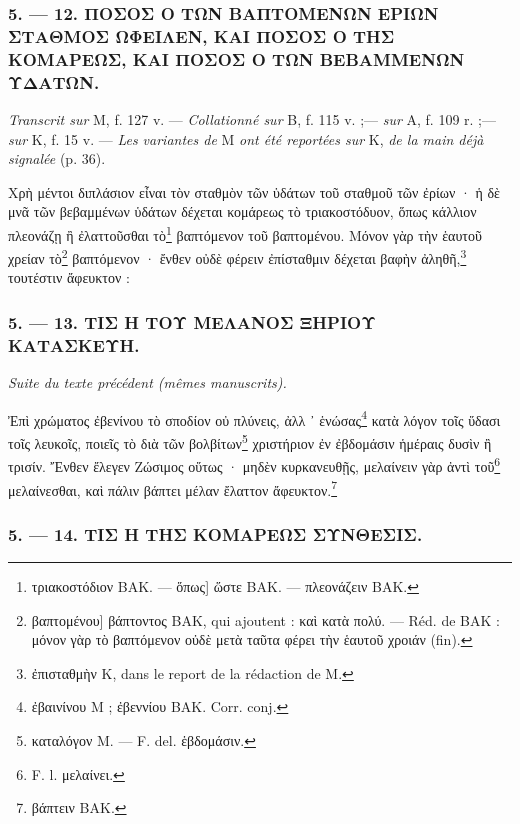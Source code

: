 \documentclass[a4paper, 11pt, oneside, polutonikogreek, french]{article}
\begin{document}
\subsubsection{5. --- 12. ΠΟΣΟΣ Ο ΤΩΝ ΒΑΠΤΟΜΕΝΩΝ ΕΡΙΩΝ ΣΤΑΘΜΟΣ ΩΦΕΙΛΕΝ, ΚΑΙ ΠΟΣΟΣ Ο ΤΗΣ ΚΟΜΑΡΕΩΣ, ΚΑΙ ΠΟΣΟΣ Ο ΤΩΝ ΒΕΒΑΜΜΕΝΩΝ ΥΔΑΤΩΝ.}

\emph{Transcrit sur} M, f. 127 v. --- \emph{Collationné sur} B, f. 115 v. ;--- \emph{sur} A, f. 109 r. ;--- \emph{sur} K, f. 15 v. --- \emph{Les variantes de} M \emph{ont été reportées sur} K, \emph{de la main déjà signalée} (p. 36).

Χρὴ μέντοι διπλάσιον εἶναι τὸν σταθμὸν τῶν ὑδάτων τοῦ σταθμοῦ τῶν ἐρίων · ἡ δὲ μνᾶ τῶν βεβαμμένων ὑδάτων δέχεται κομάρεως τὸ τριακοστόδυον, ὅπως κάλλιον πλεονάζῃ ἢ ἐλαττοῦσθαι τὸ\footnote{τριακοστόδιον BAK. --- ὅπως] ὥστε BAK. --- πλεονάζειν BAK.} βαπτόμενον τοῦ βαπτομένου. Μόνον γὰρ τὴν ἑαυτοῦ χρείαν τὸ\footnote{βαπτομένου] βάπτοντος BAK, qui ajoutent : καὶ κατὰ πολύ. --- Réd. de BAK : μόνον γὰρ τὸ βαπτόμενον οὐδὲ μετὰ ταῦτα φέρει τὴν ἑαυτοῦ χροιάν (fin).} βαπτόμενον · ἔνθεν οὐδὲ φέρειν ἐπίσταθμιν δέχεται βαφὴν ἀληθῆ,\footnote{ἐπισταθμὴν K, dans le report de la rédaction de M.} τουτέστιν ἄφευκτον :

\bigskip
\centerline{\EightStarTaper}
\centerline{\EightStarTaper\EightStarTaper}
\bigskip

\subsubsection{5. --- 13. ΤΙΣ Η ΤΟΥ ΜΕΛΑΝΟΣ ΞΗΡΙΟΥ ΚΑΤΑΣΚΕΥΗ.}

\emph{Suite du texte précédent (mêmes manuscrits).}

Ἐπὶ χρώματος ἐβενίνου τὸ σποδίον οὐ πλύνεις, ἀλλ ᾽ ἑνώσας\footnote{ἐβαινίνου M ; ἐβεννίου BAK. Corr. conj.} κατὰ λόγον τοῖς ὕδασι τοῖς λευκοῖς, ποιεῖς τὸ διὰ τῶν βολβίτων\footnote{καταλόγον M. --- F. del. ἑβδομάσιν.} χριστήριον ἐν ἐβδομάσιν ἡμέραις δυσὶν ἢ τρισίν. Ἔνθεν ἔλεγεν Ζώσιμος οὕτως · μηδὲν κυρκανευθῇς, μελαίνειν γὰρ ἀντὶ τοῦ\footnote{F. l. μελαίνει.} μελαίνεσθαι, καὶ πάλιν βάπτει μέλαν ἔλαττον ἄφευκτον.\footnote{βάπτειν BAK.}

\bigskip
\centerline{\EightStarTaper}
\centerline{\EightStarTaper\EightStarTaper}
\bigskip

\subsubsection{5. --- 14. ΤΙΣ Η ΤΗΣ ΚΟΜΑΡΕΩΣ ΣΥΝΘΕΣΙΣ.}
\end{document}
